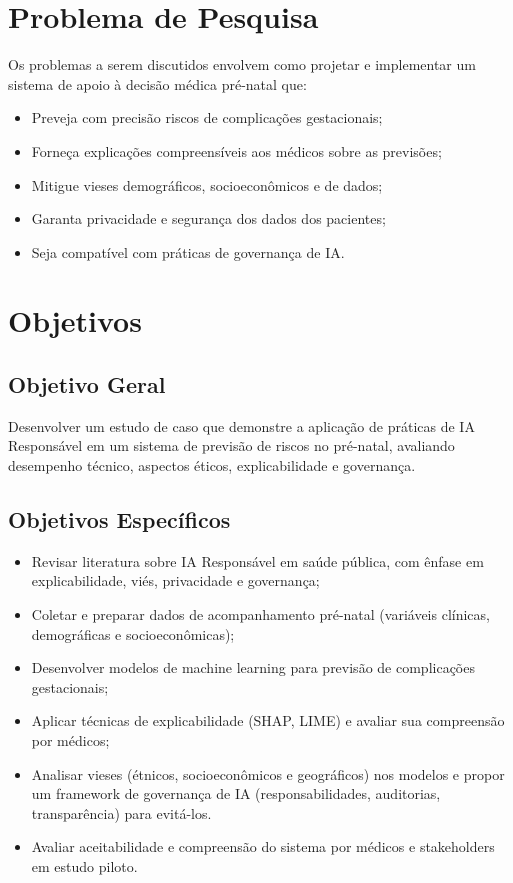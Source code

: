 \documentclass[12pt]{article}
\begin{document}
\section{Problema de Pesquisa}
Os problemas a serem discutidos envolvem como projetar e implementar um sistema de apoio à decisão médica pré-natal que:

\begin{itemize}
    \item Preveja com precisão riscos de complicações gestacionais;
    \item Forneça explicações compreensíveis aos médicos sobre as previsões;
    \item Mitigue vieses demográficos, socioeconômicos e de dados;
    \item Garanta privacidade e segurança dos dados dos pacientes;
    \item Seja compatível com práticas de governança de IA.
\end{itemize}

\section{Objetivos}

\subsection{Objetivo Geral}
Desenvolver um estudo de caso que demonstre a aplicação de práticas de IA Responsável em um sistema de previsão de riscos no pré-natal, avaliando desempenho técnico, aspectos éticos, explicabilidade e governança.

\subsection{Objetivos Específicos}
\begin{itemize}
    \item Revisar literatura sobre IA Responsável em saúde pública, com ênfase em explicabilidade, viés, privacidade e governança;
    \item Coletar e preparar dados de acompanhamento pré-natal (variáveis clínicas, demográficas e socioeconômicas);
    \item Desenvolver modelos de machine learning para previsão de complicações gestacionais;
    \item Aplicar técnicas de explicabilidade (SHAP, LIME) e avaliar sua compreensão por médicos;
    \item Analisar vieses (étnicos, socioeconômicos e geográficos) nos modelos e propor um framework de governança de IA (responsabilidades, auditorias, transparência) para evitá-los.
    \item Avaliar aceitabilidade e compreensão do sistema por médicos e stakeholders em estudo piloto.
\end{itemize}
\end{document}

